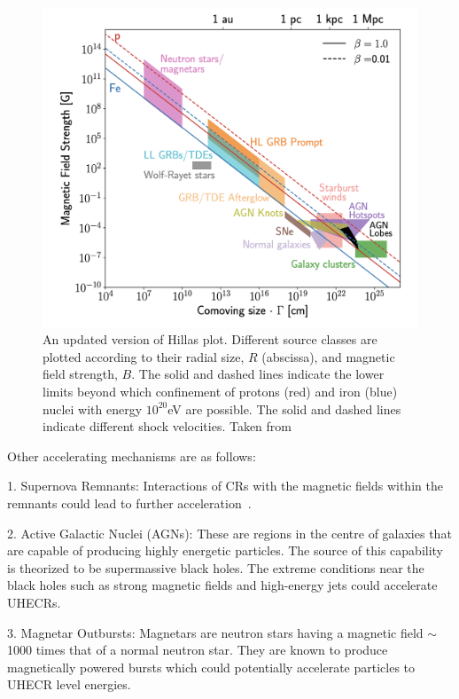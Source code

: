\begin{figure}[t!]
  \centering
  \includegraphics[width=14.5cm]{thesis_figures/CRnNu/Hillas_modified.png}
  \caption{An updated version of Hillas plot. Different source classes are plotted according to their radial size, $R$ (abscissa), and magnetic field strength, $B$. The solid and dashed lines indicate the lower limits beyond which confinement of protons (red) and iron (blue) nuclei with energy $10^{20}$eV are possible. The solid and dashed lines indicate different shock velocities. Taken from~\cite{AlvesBatista:2019tlv}}
  \label{fig:Hillas_modified}
\end{figure}


Other accelerating mechanisms are as follows:

1. Supernova Remnants:  Interactions of CRs with the magnetic fields within the remnants could lead to further acceleration~\cite{BLASI_2011}.

2. Active Galactic Nuclei (AGNs): These are regions in the centre of galaxies that are capable of producing highly energetic particles. The source of this capability is theorized to be supermassive black holes. The extreme conditions near the black holes such as strong magnetic fields and high-energy jets could accelerate UHECRs.~\cite{Rieger_2022}

3. Magnetar Outbursts: Magnetars are neutron stars having a magnetic field $\sim$1000 times that of a normal neutron star. They are known to produce magnetically powered bursts which could potentially accelerate particles to UHECR level energies.~\cite{PhysRevD.84.023002}

